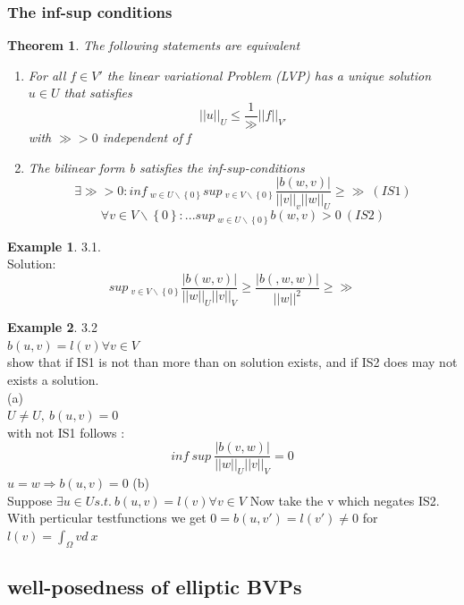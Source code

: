 \documentclass[english]{article}
\newtheorem*{theorem}{Theorem}
\theoremstyle{definition}
\newtheorem*{exa}{Example}
\theoremstyle{remark}
\newcommand{\f}[2]{\frac{#1}{#2}}							%
\newcommand{\OO}{\Omega}
\newcommand{\drw}{\Rightarrow}			%
\begin{document}
\subsubsection{ The inf-sup conditions }
\begin{theorem}
  The following statements are equivalent
  \begin{enumerate}
  \item For all $f \in V'$ the linear variational Problem (LVP) has a unique solution $u \in U$ that satisfies 
    $$||u||_U \leq \f{1}{\gg}||f||_{V'}$$
    with $\gg>0$ independent of f\\
  \item The bilinear form b satisfies the \emph{inf-sup-conditions}
    $$\exists \gg >0: inf\ _{w \in U \backslash\left\{0\right\} } sup\ _{v \in V \backslash \left\{0\right\}} \f{|b(w,v)|}{||v||_v||w||_U} \geq \gg \ (IS1)$$
    $$\forall v \in V \backslash\left\{0\right\} : ... sup\ _{w \in U \backslash\left\{0\right\}} b(w,v)>0 \ (IS2)$$
  \end{enumerate}
\end{theorem}

\begin{exa}
3.1.\\
Solution:\\
$$sup\ _{v \in V \backslash\left\{0\right\}} \f{|b(w,v)|}{||w||_U ||v||_V} \geq \f{|b(,w,w)|}{||w||^2}\geq \gg$$
\end{exa}
\begin{exa}3.2\\
$b(u,v) = l(v) \forall v \in V$\\
show that if IS1 is not than more than on solution exists, and if IS2 does may not exists a solution.\\
(a)\\
$U\neq U, \ b(u,v) =0$ \\
with not IS1 follows : $$inf\ sup\ \f{|b(v,w)|}{||w||_U||v||_V} =0$$
$u=w \drw b(u,v) = 0$
(b)\\
Suppose $\exists u \in U s.t.\ b(u,v) = l(v) \forall v \in V$ Now take the v which negates IS2.\\
With perticular testfunctions we get $0= b(u,v') =l(v')\neq 0$ for $l(v) = \int_\OO v d\ x$
\end{exa}
\subsection{well-posedness of elliptic BVPs}
\end{document}
